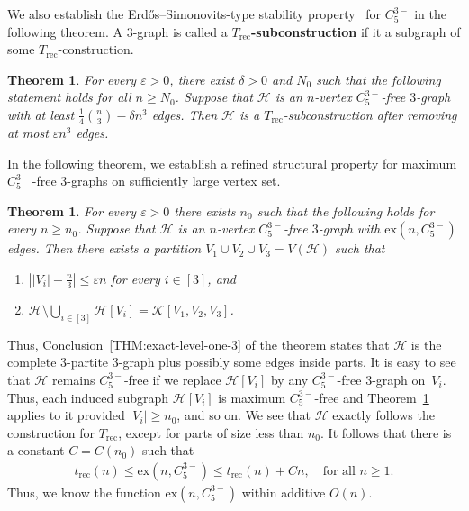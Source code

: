 \documentclass[11pt,a4paper]{article}
\newtheorem{theorem}[definition]{Theorem}
\theoremstyle{remark}
\newcommand{\C}[1]{\mathcal{#1}}
\begin{document}
We also establish the Erd{\H o}s--Simonovits-type stability property~\cite{Erdos67a,Sim68} for $C_{5}^{3-}$ in the following theorem. A $3$-graph is called a \textbf{$T_{\mathrm{rec}}$-subconstruction} if it a subgraph of some $T_{\mathrm{rec}}$-construction. 
%
\begin{theorem}\label{THM:C5Minus-stability}
    For every $\varepsilon > 0$, there exist $\delta > 0$ and $N_0$ such that the following statement holds for all $n \ge N_0$. 
    Suppose that $\mathcal{H}$ is an $n$-vertex $C_{5}^{3-}$-free $3$-graph with at least $\frac{1}{4}\binom{n}{3} - \delta n^3$ edges. 
    Then $\mathcal{H}$ is a $T_{\mathrm{rec}}$-subconstruction after removing at most $\varepsilon n^3$ edges.      
\end{theorem}
%
In the following theorem, we establish a refined structural property for maximum $C_{5}^{3-}$-free 3-graphs on sufficiently large vertex set.  
%
\begin{theorem}\label{THM:exact-level-one}
    For every $\varepsilon > 0$ there exists $n_0$ such that the following holds for every $n \ge n_0$. 
    Suppose that $\mathcal{H}$ is an $n$-vertex $C_{5}^{3-}$-free $3$-graph with $\mathrm{ex}(n,C_{5}^{3-})$ edges. Then there exists a partition $V_1 \cup V_2 \cup V_3 = V(\mathcal{H})$ such that 
    \begin{enumerate}[label=(\roman*)]
        \item\label{THM:exact-level-one-1} $\left||V_i| - \frac{n}{3}\right| \le \varepsilon n$ for every $i \in [3]$, and
        \item\label{THM:exact-level-one-3} $\mathcal{H} \setminus \bigcup_{i\in [3]}\mathcal{H}[V_i] = \mathcal{K}[V_1, V_2, V_3]$. 
    \end{enumerate}
\end{theorem}
%
Thus, Conclusion~\ref{THM:exact-level-one-3} of the theorem states that $\mathcal{H}$ is the complete $3$-partite $3$-graph plus possibly some edges inside parts. It is easy to see that $\C H$ remains $C_{5}^{3-}$-free if we replace $\C H[V_i]$ by any $C_{5}^{3-}$-free $3$-graph on~$V_i$. Thus, each induced subgraph $\C H[V_i]$ is maximum $C_{5}^{3-}$-free and Theorem~\ref{THM:exact-level-one} applies to it provided $|V_i|\ge n_0$, and so on. We see that $\C H$ exactly follows the construction for $T_{\mathrm{rec}}$, except for parts of size less than $n_0$. It follows that there is a constant $C=C(n_0)$ such that 
\begin{align*}
    t_{\mathrm{rec}}(n)
    \le \mathrm{ex}(n,C_{5}^{3-})
    \le t_{\mathrm{rec}}(n) + Cn,\quad\mbox{for all $n\ge 1$}.
\end{align*}
Thus, we know the function $\mathrm{ex}(n,C_{5}^{3-})$ within additive $O(n)$.
\end{document}
